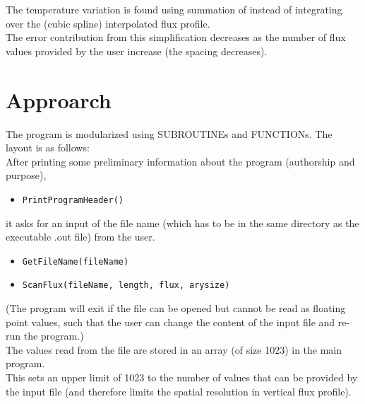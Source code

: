 \documentclass[a4paper, 12pt]{article}
\begin{document}
The temperature variation is found using summation of instead of integrating over the (cubic spline) interpolated flux profile.\\

The error contribution from this simplification decreases as the number of flux values provided by the user increase (the spacing decreases).

\section{Approarch}
The program is modularized using \textcolor{subr}{SUBROUTINE}s and \textcolor{func}{FUNCTION}s. The layout is as follows:\\

After printing some preliminary information about the program (authorship and purpose),
\begin{itemize}
	\item \texttt{\textcolor{subr}{PrintProgramHeader}()}
\end{itemize}

it asks for an input of the file name (which has to be in the same directory as the executable .out file) from the user.
\begin{itemize}
	\item \texttt{\textcolor{subr}{GetFileName}(fileName)}
	\item \texttt{\textcolor{subr}{ScanFlux}(fileName, length, flux, arysize)}
\end{itemize}
(The program will exit if the file can be opened but cannot be read as floating point values, such that the user can change the content of the input file and re-run the program.)\\
The values read from the file are stored in an array (of size 1023) in the main program. \\
This sets an upper limit of 1023 to the number of values that can be provided by the input file (and therefore limits the spatial resolution in vertical flux profile).\\
\end{document}
